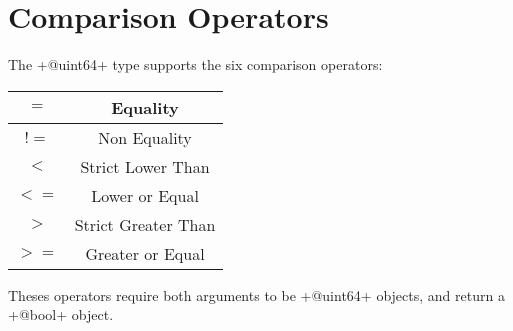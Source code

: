 \section{Comparison Operators}

The \ggs+@uint64+ type supports the six comparison operators:

\begin{tabular}{|c|c|}
\hline
$=$ & Equality \\
\hline
$!=$ & Non Equality \\
\hline
$<$  & Strict Lower Than \\
\hline
$<=$  & Lower or Equal \\
\hline
$>$  & Strict Greater Than \\
\hline
$>=$  & Greater or Equal \\
\hline
\end{tabular}

Theses operators require both arguments to be \ggs+@uint64+ objects, and return a \ggs+@bool+ object.
